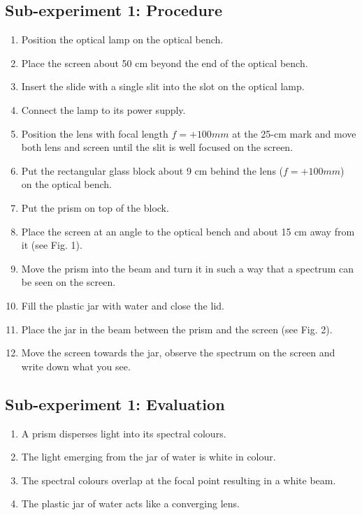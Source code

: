 \documentclass[12pt]{article}
\begin{document}
\subsection*{Sub-experiment 1: Procedure}
\begin{enumerate}
    \item Position the optical lamp on the optical bench. 
    \item Place the screen about 50 cm beyond the end of the optical bench. 
    \item Insert the slide with a single slit into the slot on the optical lamp. 
    \item Connect the lamp to its power supply. 
    \item Position the lens with focal length $f = + 100 mm$ at the 25-cm mark and move both lens and screen until the slit is well focused on the screen. 
    \item Put the rectangular glass block about 9 cm behind the lens ($f = + 100 mm$) on the optical bench.
    \item Put the prism on top of the block.
    \item Place the screen at an angle to the optical bench and about 15 cm away from it (see Fig. 1). 
    \item Move the prism into the beam and turn it in such a way that a spectrum can be seen on the screen. 
    \item Fill the plastic jar with water and close the lid. 
    \item Place the jar in the beam between the prism and the screen (see Fig. 2).
    \item Move the screen towards the jar, observe the spectrum on the screen and write down what you see. 
\end{enumerate}

\subsection*{Sub-experiment 1: Evaluation}
\begin{enumerate}
    \item A prism disperses light into its spectral colours. 
    \item The light emerging from the jar of water is white in colour. 
    \item The spectral colours overlap at the focal point resulting in a white beam. 
    \item The plastic jar of water acts like a converging lens.  
\end{enumerate}
\end{document}
